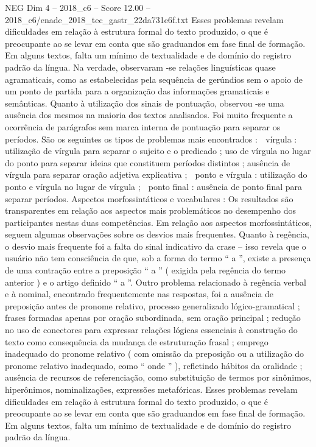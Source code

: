 \begin{textsample}{NEG Dim 4 – 2018\_c6 – Score 12.00 – 2018\_c6/enade\_2018\_tec\_gastr\_22da731e6f.txt}
Esses problemas revelam dificuldades em relação à estrutura formal do texto produzido, o que é preocupante ao se levar em conta que são graduandos em fase final de formação.
Em alguns textos, falta um mínimo de textualidade e de domínio do registro padrão da língua.
Na verdade, observaram -se relações linguísticas quase agramaticais, como as estabelecidas pela sequência de gerúndios sem o apoio de um ponto de partida para a organização das informações gramaticais e semânticas.
Quanto à utilização dos sinais de pontuação, observou -se uma ausência dos mesmos na maioria dos textos analisados.
Foi muito frequente a ocorrência de parágrafos sem marca interna de pontuação para separar os períodos.
São os seguintes os tipos de problemas mais encontrados :  vírgula : utilização de vírgula para separar o sujeito e o predicado ; uso de vírgula no lugar do ponto para separar ideias que constituem períodos distintos ; ausência de vírgula para separar oração adjetiva explicativa ;  ponto e vírgula : utilização do ponto e vírgula no lugar de vírgula ;  ponto final : ausência de ponto final para separar períodos.
Aspectos morfossintáticos e vocabulares : Os resultados são transparentes em relação aos aspectos mais problemáticos no desempenho dos participantes nestas duas competências.
Em relação aos aspectos morfossintáticos, seguem algumas observações sobre os desvios mais frequentes.
Quanto à regência, o desvio mais frequente foi a falta do sinal indicativo da crase – isso revela que o usuário não tem consciência de que, sob a forma do termo “ a ”, existe a presença de uma contração entre a preposição “ a ” ( exigida pela regência do termo anterior ) e o artigo definido “ a ”.
Outro problema relacionado à regência verbal e à nominal, encontrado frequentemente nas respostas, foi a ausência de preposição antes de pronome relativo, processo generalizado lógico-gramatical ; frases formadas apenas por oração subordinada, sem oração principal ; redução no uso de conectores para expressar relações lógicas essenciais à construção do texto como consequência da mudança de estruturação frasal ; emprego inadequado do pronome relativo ( com omissão da preposição ou a utilização do pronome relativo inadequado, como “ onde ” ), refletindo hábitos da oralidade ; ausência de recursos de referenciação, como substituição de termos por sinônimos, hiperônimos, nominalizações, expressões metafóricas.
Esses problemas revelam dificuldades em relação à estrutura formal do texto produzido, o que é preocupante ao se levar em conta que são graduandos em fase final de formação.
Em alguns textos, falta um mínimo de textualidade e de domínio do registro padrão da língua.

\end{textsample}
